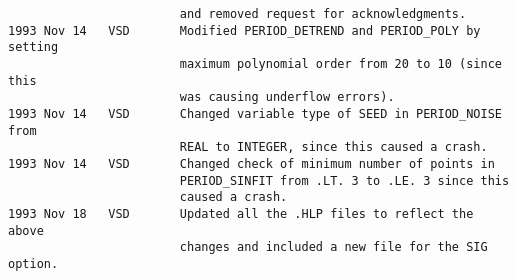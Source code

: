 \begin{verbatim}
                        and removed request for acknowledgments.
1993 Nov 14   VSD       Modified PERIOD_DETREND and PERIOD_POLY by setting
                        maximum polynomial order from 20 to 10 (since this
                        was causing underflow errors).
1993 Nov 14   VSD       Changed variable type of SEED in PERIOD_NOISE from
                        REAL to INTEGER, since this caused a crash.
1993 Nov 14   VSD       Changed check of minimum number of points in
                        PERIOD_SINFIT from .LT. 3 to .LE. 3 since this
                        caused a crash.
1993 Nov 18   VSD       Updated all the .HLP files to reflect the above
                        changes and included a new file for the SIG option.

\end{verbatim}


\newpage


